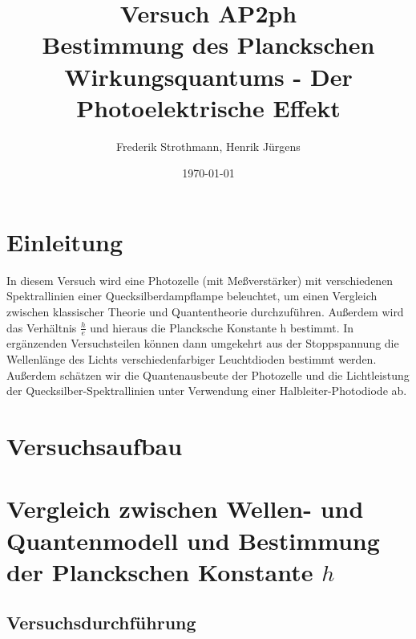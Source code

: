 \documentclass[12pt]{scrartcl}
\title{Versuch AP2ph\\ Bestimmung des Planckschen Wirkungsquantums - Der Photoelektrische Effekt}
\author{Frederik Strothmann, Henrik Jürgens}
\date{\today}
\begin{document}

\maketitle
\tableofcontents
\newpage


\section{Einleitung}

In diesem Versuch wird eine Photozelle (mit Meßverstärker) mit verschiedenen Spektrallinien einer Quecksilberdampflampe beleuchtet, um einen Vergleich zwischen klassischer Theorie und Quantentheorie durchzuführen.
Außerdem wird das Verhältnis $\frac{h}{e}$ und hieraus die Plancksche Konstante h
bestimmt.
In ergänzenden Versuchsteilen können dann umgekehrt aus der Stoppspannung die Wellenlänge des Lichts verschiedenfarbiger Leuchtdioden bestimmt werden.
Außerdem schätzen wir die Quantenausbeute der Photozelle und die Lichtleistung der Quecksilber-Spektrallinien
unter Verwendung einer Halbleiter-Photodiode ab.

\section{Versuchsaufbau}

\section{Vergleich zwischen Wellen- und Quantenmodell und Bestimmung der Planckschen
Konstante $h$}
\subsection{Versuchsdurchführung}
\end{document}
